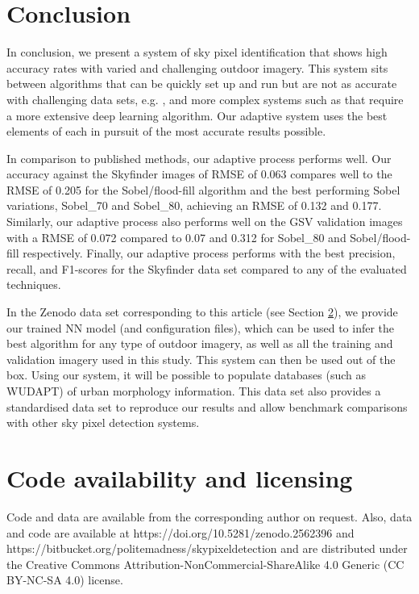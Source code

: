 \documentclass[final,3p,times,authoryear]{elsarticle}
\begin{document}
\section{Conclusion}\label{sec:conclusion}

In conclusion, we present a system of sky pixel identification that shows high accuracy rates with varied and challenging outdoor imagery. This system sits between algorithms that can be quickly set up and run but are not as accurate with challenging data sets, e.g. \cite{Middel2018}, and more complex systems such as \cite{Gong2018} that require a more extensive deep learning algorithm. Our adaptive system uses the best elements of each in pursuit of the most accurate results possible.

In comparison to published methods, our adaptive process performs well. Our accuracy against the Skyfinder images of RMSE of 0.063 compares well to the RMSE of 0.205 for the \cite{Middel2018} Sobel/flood-fill algorithm and the best performing \cite{Wang2015a} Sobel variations, Sobel\_70 and Sobel\_80, achieving an RMSE of 0.132 and 0.177. Similarly, our adaptive process also performs well on the GSV validation images with a RMSE of 0.072 compared to 0.07 and 0.312 for Sobel\_80 and Sobel/flood-fill respectively. Finally, our adaptive process performs with the best precision, recall, and F1-scores for the Skyfinder data set compared to any of the evaluated techniques.

In the Zenodo data set corresponding to this article (see Section \ref{sec:available}), we provide our trained NN model (and configuration files), which can be used to infer the best algorithm for any type of outdoor imagery, as well as all the training and validation imagery used in this study. This system can then be used out of the box. Using our system, it will be possible to populate databases (such as WUDAPT) of urban morphology information. This data set also provides a standardised data set to reproduce our results and allow benchmark comparisons with other sky pixel detection systems.






\section{Code availability and licensing}\label{sec:available}
Code and data are available from the corresponding author on request. Also, data and code are available at 
https://doi.org/10.5281/zenodo.2562396 and https://bitbucket.org/politemadness/skypixeldetection \citep{Nice2019SkyCode} and are distributed under the Creative Commons Attribution-NonCommercial-ShareAlike 4.0 Generic (CC BY-NC-SA 4.0) license. 
\end{document}
